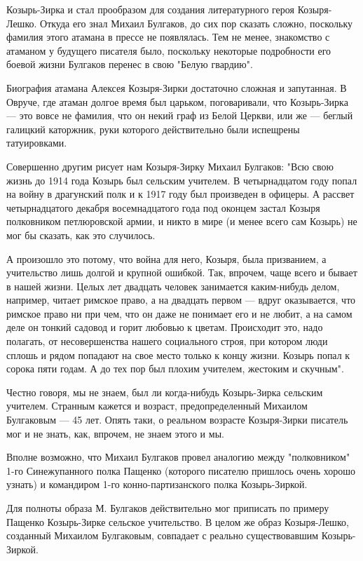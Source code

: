 Козырь-Зирка и стал прообразом для создания литературного героя Козыря-Лешко.
Откуда его знал Михаил Булгаков, до сих пор сказать сложно, поскольку фамилия
этого атамана в прессе не появлялась. Тем не менее, знакомство с атаманом у
будущего писателя было, поскольку некоторые подробности его боевой жизни
Булгаков перенес в свою "Белую гвардию".

Биография атамана Алексея Козыря-Зирки достаточно сложная и запутанная. В
Овруче, где атаман долгое время был царьком, поговаривали, что Козырь-Зирка —
это вовсе не фамилия, что он некий граф из Белой Церкви, или же — беглый
галицкий каторжник, руки которого действительно были испещрены татуировками.

Совершенно другим рисует нам Козыря-Зирку Михаил Булгаков: "Всю свою жизнь до
1914 года Козырь был сельским учителем. В четырнадцатом году попал на войну в
драгунский полк и к 1917 году был произведен в офицеры. А рассвет
четырнадцатого декабря восемнадцатого года под оконцем застал Козыря
полковником петлюровской армии, и никто в мире (и менее всего сам Козырь) не
мог бы сказать, как это случилось. 

А произошло это потому, что война для него, Козыря, была призванием, а
учительство лишь долгой и крупной ошибкой. Так, впрочем, чаще всего и
бывает в нашей жизни. Целых лет двадцать человек занимается каким-нибудь
делом, например, читает римское право, а на двадцать первом — вдруг
оказывается, что римское право ни при чем, что он даже не понимает его и
не любит, а на самом деле он тонкий садовод и горит любовью к цветам.
Происходит это, надо полагать, от несовершенства нашего социального строя,
при котором люди сплошь и рядом попадают на свое место только к концу
жизни. Козырь попал к сорока пяти годам. А до тех пор был плохим учителем,
жестоким и скучным".

Честно говоря, мы не знаем, был ли когда-нибудь Козырь-Зирка сельским учителем.
Странным кажется и возраст, предопределенный Михаилом Булгаковым — 45 лет.
Опять таки, о реальном возрасте Козыря-Зирки писатель мог и не знать, как,
впрочем, не знаем этого и мы. 

Вполне возможно, что Михаил Булгаков провел аналогию между "полковником"
1-го Синежупанного полка Пащенко (которого писателю пришлось очень хорошо
узнать) и командиром 1-го конно-партизанского полка Козырь-Зиркой. 

Для полноты образа М. Булгаков действительно мог приписать по примеру
Пащенко Козырь-Зирке сельское учительство. В целом же образ Козыря-Лешко,
созданный Михаилом Булгаковым, совпадает с реально существовавшим
Козырь-Зиркой.

